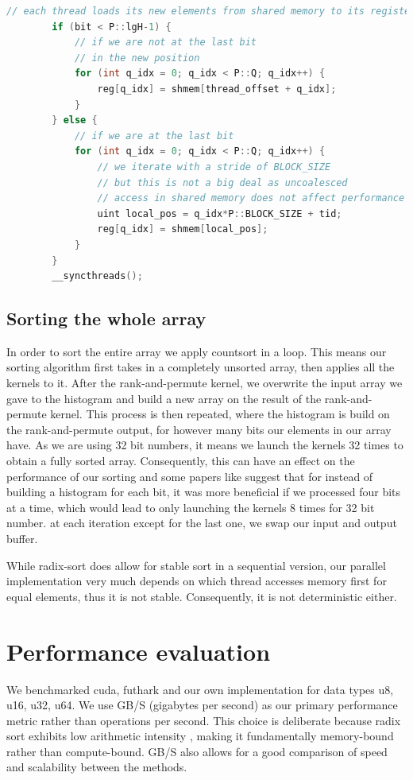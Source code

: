 \documentclass{article}
\begin{document}
\begin{lstlisting}[language=c++]
        // each thread loads its new elements from shared memory to its registers
        if (bit < P::lgH-1) {
            // if we are not at the last bit
            // in the new position
            for (int q_idx = 0; q_idx < P::Q; q_idx++) {
                reg[q_idx] = shmem[thread_offset + q_idx];
            }
        } else {
            // if we are at the last bit
            for (int q_idx = 0; q_idx < P::Q; q_idx++) {
                // we iterate with a stride of BLOCK_SIZE
                // but this is not a big deal as uncoalesced 
                // access in shared memory does not affect performance
                uint local_pos = q_idx*P::BLOCK_SIZE + tid;
                reg[q_idx] = shmem[local_pos];
            }
        }
        __syncthreads();
\end{lstlisting}


\subsection{Sorting the whole array}


In order to sort the entire array we apply countsort in a loop. 
This means our sorting algorithm first takes in a completely unsorted array, then applies all the kernels to it. 
After the rank-and-permute kernel, we overwrite the input array we gave to the histogram and build a new array on the result of the rank-and-permute kernel. 
This process is then repeated, where the histogram is build on the rank-and-permute output, for however many bits our elements in our array have. 
As we are using 32 bit numbers, it means we launch the kernels 32 times to obtain a fully sorted array. 
Consequently, this can have an effect on the performance of our sorting and some papers like \cite{satish} suggest that for instead of building a histogram for each bit, it was more beneficial if we processed four bits at a time, which would lead to only launching the kernels 8 times for 32 bit number. 
at each iteration except for the last one, we swap our input and output buffer.

While radix-sort does allow for stable sort in a sequential version, our parallel implementation very much depends on which thread accesses memory first for equal elements, thus it is not stable. Consequently, it is not deterministic either. 

\section{Performance evaluation}
We benchmarked cuda, futhark and our own implementation for data types u8, u16, u32, u64.
We use GB/S (gigabytes per second) as our primary performance metric rather than operations per second. This choice is deliberate because radix sort exhibits low arithmetic intensity \citep{ha2010implicit}, making it fundamentally memory-bound rather than compute-bound. GB/S also allows for a good comparison of speed and scalability between the methods.
\end{document}
